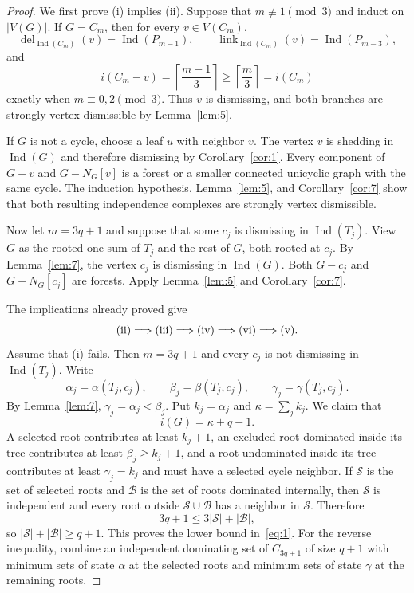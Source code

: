 \documentclass[11pt]{amsart}
\DeclareMathOperator{\link}{link}
\DeclareMathOperator{\del}{del}
\DeclareMathOperator{\Ind}{Ind}
\theoremstyle{definition}
\begin{document}
	\begin{proof}
		We first prove (i) implies (ii).  Suppose that $m\not\equiv1\pmod3$ and induct on $|V(G)|$.  If $G=C_m$, then for every $v\in V(C_m)$,
		\[
		\del_{\Ind(C_m)}(v)=\Ind(P_{m-1}),
		\qquad
		\link_{\Ind(C_m)}(v)=\Ind(P_{m-3}),
		\]
		and
		\[
		i(C_m-v)=\left\lceil\frac{m-1}{3}\right\rceil
		\geq \left\lceil\frac m3\right\rceil=i(C_m)
		\]
		exactly when $m\equiv0,2\pmod3$.  Thus $v$ is dismissing, and both branches are strongly vertex dismissible by Lemma~\ref{lem:5}.
		
		If $G$ is not a cycle, choose a leaf $u$ with neighbor $v$.  The vertex $v$ is shedding in $\Ind(G)$ and therefore dismissing by Corollary~\ref{cor:1}.  Every component of $G-v$ and $G-N_G[v]$ is a forest or a smaller connected unicyclic graph with the same cycle.  The induction hypothesis, Lemma~\ref{lem:5}, and Corollary~\ref{cor:7} show that both resulting independence complexes are strongly vertex dismissible.
		
		Now let $m=3q+1$ and suppose that some $c_j$ is dismissing in $\Ind(T_j)$.  View $G$ as the rooted one-sum of $T_j$ and the rest of $G$, both rooted at $c_j$.  By Lemma~\ref{lem:7}, the vertex $c_j$ is dismissing in $\Ind(G)$.  Both $G-c_j$ and $G-N_G[c_j]$ are forests.  Apply Lemma~\ref{lem:5} and Corollary~\ref{cor:7}.
		
		The implications already proved give
		\[
		\textup{(ii)}\Longrightarrow\textup{(iii)}
		\Longrightarrow\textup{(iv)}
		\Longrightarrow\textup{(vi)}
		\Longrightarrow\textup{(v)}.
		\]
		Assume that (i) fails.  Then $m=3q+1$ and every $c_j$ is not dismissing in $\Ind(T_j)$.  Write
		\[
		\alpha_j=\alpha(T_j,c_j),\qquad
		\beta_j=\beta(T_j,c_j),\qquad
		\gamma_j=\gamma(T_j,c_j).
		\]
		By Lemma~\ref{lem:7}, $\gamma_j=\alpha_j<\beta_j$.  Put $k_j=\alpha_j$ and $\kappa=\sum_jk_j$.  We claim that
		\begin{equation}\label{eq:1}
			i(G)=\kappa+q+1.
		\end{equation}
		A selected root contributes at least $k_j+1$, an excluded root dominated inside its tree contributes at least $\beta_j\geq k_j+1$, and a root undominated inside its tree contributes at least $\gamma_j=k_j$ and must have a selected cycle neighbor.  If $\mathcal S$ is the set of selected roots and $\mathcal B$ is the set of roots dominated internally, then $\mathcal S$ is independent and every root outside $\mathcal S\cup\mathcal B$ has a neighbor in $\mathcal S$.  Therefore
		\[
		3q+1\leq3|\mathcal S|+|\mathcal B|,
		\]
		so $|\mathcal S|+|\mathcal B|\geq q+1$.  This proves the lower bound in~\eqref{eq:1}. For the reverse inequality, combine an independent dominating set of $C_{3q+1}$ of size $q+1$ with minimum sets of state $\alpha$ at the selected roots and minimum sets of state $\gamma$ at the remaining roots.
		

\end{proof}
\end{document}
